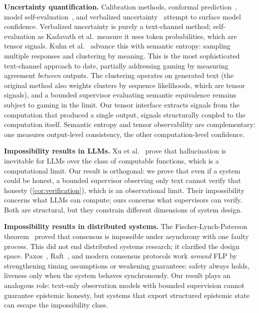 \documentclass[11pt]{article}
\newcommand{\fakepara}[1]{\noindent\textbf{#1}\xspace}
\begin{document}
\fakepara{Uncertainty quantification.} Calibration methods, conformal
prediction~\citep{angelopoulos2021gentle}, model self-evaluation~\citep{kadavath2022language},
and verbalized uncertainty~\citep{lin2022teaching} attempt to surface model
confidence. Verbalized uncertainty is purely a text-channel method; self-evaluation
as Kadavath et al.\ measure it uses token probabilities, which are tensor signals. Kuhn et
al.~\citep{kuhn2023semanticuncertaintylinguisticinvariances} advance this with
semantic entropy: sampling multiple responses and clustering by meaning. This
is the most sophisticated text-channel approach to date, partially addressing
gaming by measuring agreement \emph{between} outputs. The clustering operates on generated text (the original method also weights
clusters by sequence likelihoods, which are tensor signals), and a bounded
supervisor evaluating semantic equivalence remains subject to gaming in the
limit. Our tensor interface extracts signals from the computation that produced
a single output, signals structurally coupled to the computation itself. Semantic
entropy and tensor observability are complementary: one measures output-level
consistency, the other computation-level confidence.

\fakepara{Impossibility results in LLMs.} Xu et
al.~\citep{xu2024hallucination} prove that hallucination is inevitable for LLMs
over the class of computable functions, which is a computational limit. Our result is
orthogonal: we prove that even if a system could be honest, a bounded
supervisor observing only text cannot verify that honesty
(\autoref{cor:verification}), which is an observational
limit. Their impossibility concerns what LLMs can compute; ours concerns what
supervisors can verify. Both are structural, but they constrain different
dimensions of system design.

\fakepara{Impossibility results in distributed systems.} The
Fischer-Lynch-Paterson theorem~\citep{flp} proved that consensus is impossible
under asynchrony with one faulty process. This did not end distributed systems
research; it clarified the design space. Paxos~\citep{paxos}, Raft~\citep{raft}, and modern
consensus protocols work \emph{around} FLP by strengthening timing
assumptions or weakening guarantees: safety always holds, liveness only when the
system behaves synchronously. Our result plays an analogous role: text-only
observation models with bounded supervision cannot guarantee epistemic honesty,
but systems that export structured epistemic state can escape the impossibility
class.
\end{document}
